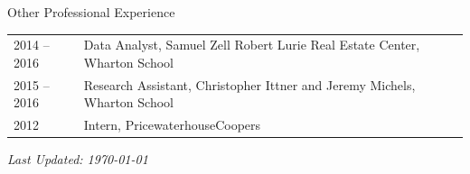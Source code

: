\documentclass{resume} %
\begin{document}

\begin{rSection}{Other Professional Experience}

\begin{tabular}{p{2cm}p{15.5cm}}
2014 -- 2016 & Data Analyst, Samuel Zell Robert Lurie Real Estate Center, Wharton School \medskip \\
2015 -- 2016 & Research Assistant, Christopher Ittner and Jeremy Michels, Wharton School \medskip \\
2012 & Intern, PricewaterhouseCoopers
\end{tabular}

\end{rSection}


\vfill\hfill {\em Last Updated: \today} {\parfillskip=3mm\par}
\end{document}
